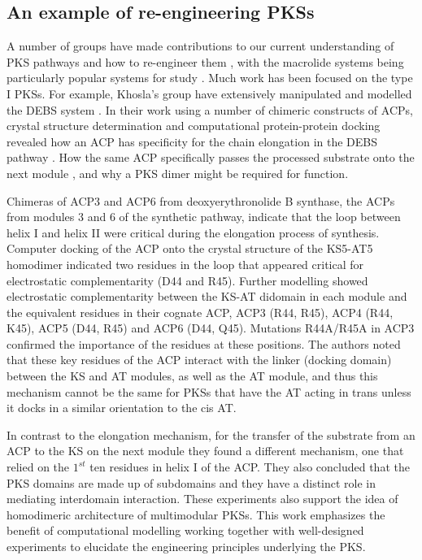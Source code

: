 		\subsection{An example of re-engineering PKSs}
		\label{sec: reengineer}
		A number of groups have made contributions to our current understanding of PKS pathways and how to re-engineer them \parencite{Weissman2005, Challis2008, Piel2010, Kwon2012}, with the macrolide systems being particularly popular systems for study \parencite{Park2010}. Much work has been focused on the type I PKSs. For example, Khosla's group have extensively manipulated and modelled the DEBS system \parencite{Khosla2007}. In their work using a number of chimeric constructs of ACPs, crystal structure determination and computational protein-protein docking revealed how an ACP has specificity for the chain elongation in the DEBS pathway \parencite{Kapur2010}. How the same ACP specifically passes the processed substrate onto the next module \parencite{Kapur2010, Kapur2012}, and why a PKS dimer might be required for function.
		
		Chimeras of ACP3 and ACP6 from deoxyerythronolide B synthase, the ACPs from modules 3 and 6 of the synthetic pathway, indicate that the loop between helix I and helix II were critical during the elongation process of synthesis. Computer docking of the ACP onto the crystal structure of the KS5-AT5 homodimer indicated two residues in the loop that appeared critical for electrostatic complementarity (D44 and R45). Further modelling showed electrostatic complementarity between the KS-AT didomain in each module and the equivalent residues in their cognate ACP, ACP3 (R44, R45), ACP4 (R44, K45), ACP5 (D44, R45) and ACP6 (D44, Q45). Mutations R44A/R45A in ACP3 confirmed the importance of the residues at these positions. The authors noted that these key residues of the ACP interact with the linker (docking domain) between the KS and AT modules, as well as the AT module, and thus this mechanism cannot be the same for PKSs that have the AT acting in trans unless it docks in a similar orientation to the cis AT.
		
		In contrast to the elongation mechanism, for the transfer of the substrate from an ACP to the KS on the next module they found a different mechanism, one that relied on the $ 1^{st} $ ten residues in helix I of the ACP. They also concluded that the PKS domains are made up of subdomains and they have a distinct role in mediating interdomain interaction. These experiments also support the idea of homodimeric architecture of multimodular PKSs. This work emphasizes the benefit of computational modelling working together with well-designed experiments to elucidate the engineering principles underlying the PKS.
		
